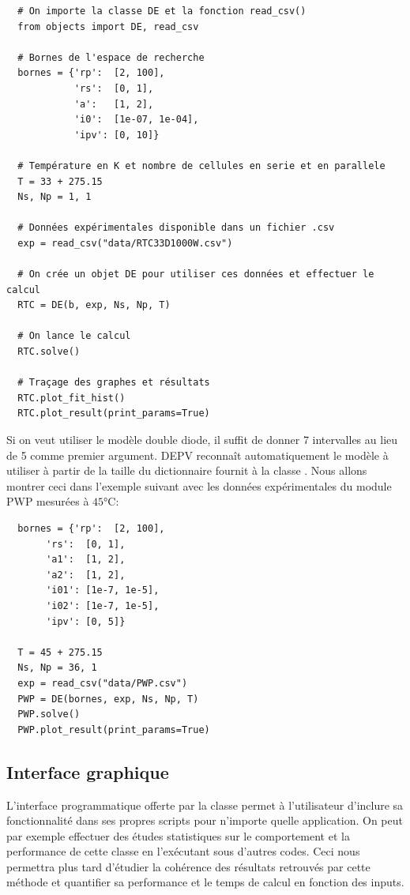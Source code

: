 \begin{verbatim}
  # On importe la classe DE et la fonction read_csv()
  from objects import DE, read_csv

  # Bornes de l'espace de recherche
  bornes = {'rp':  [2, 100],
            'rs':  [0, 1],
            'a':   [1, 2],
            'i0':  [1e-07, 1e-04],
            'ipv': [0, 10]}
  
  # Température en K et nombre de cellules en serie et en parallele
  T = 33 + 275.15
  Ns, Np = 1, 1

  # Données expérimentales disponible dans un fichier .csv
  exp = read_csv("data/RTC33D1000W.csv")

  # On crée un objet DE pour utiliser ces données et effectuer le calcul
  RTC = DE(b, exp, Ns, Np, T)

  # On lance le calcul
  RTC.solve()

  # Traçage des graphes et résultats
  RTC.plot_fit_hist()
  RTC.plot_result(print_params=True)
\end{verbatim}
Si on veut utiliser le modèle double diode, il suffit de donner 7 intervalles au lieu de 5 comme premier argument. DEPV reconnaît automatiquement le modèle à utiliser à partir de la taille du dictionnaire  fournit à la classe . Nous allons montrer ceci dans l'exemple suivant avec les données expérimentales du module PWP mesurées à $45$\si{\celsius}:
\begin{verbatim}
  bornes = {'rp':  [2, 100],
       'rs':  [0, 1],
       'a1':  [1, 2],
       'a2':  [1, 2],
       'i01': [1e-7, 1e-5],
       'i02': [1e-7, 1e-5],
       'ipv': [0, 5]}
       
  T = 45 + 275.15
  Ns, Np = 36, 1
  exp = read_csv("data/PWP.csv")
  PWP = DE(bornes, exp, Ns, Np, T)
  PWP.solve()
  PWP.plot_result(print_params=True)
\end{verbatim}


\subsection{Interface graphique}
L'interface programmatique offerte par la classe  permet à l'utilisateur d'inclure sa fonctionnalité dans ses propres scripts pour n'importe quelle application. On peut par exemple effectuer des études statistiques sur le comportement et la performance de cette classe en l'exécutant sous d'autres codes. Ceci nous permettra plus tard d'étudier la cohérence des résultats retrouvés par cette méthode et quantifier sa performance et le temps de calcul en fonction des inputs.

